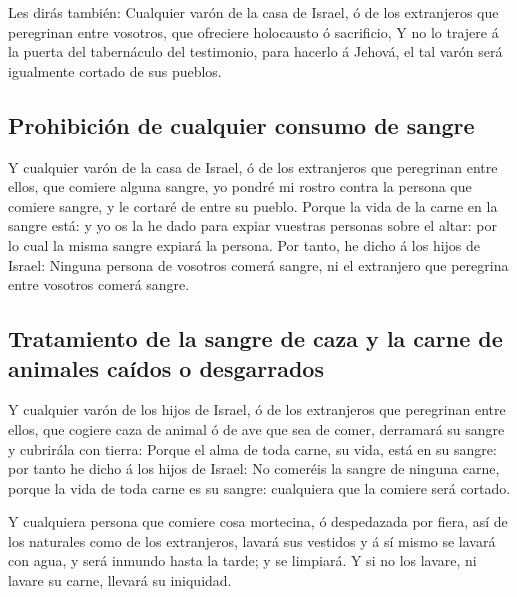  Les dirás también: Cualquier varón de la casa de Israel,
ó de los extranjeros que peregrinan entre vosotros, que ofreciere
holocausto ó sacrificio,  Y no lo trajere á la puerta del
tabernáculo del testimonio, para hacerlo á Jehová, el tal varón será
igualmente cortado de sus pueblos.

\hypertarget{prohibiciuxf3n-de-cualquier-consumo-de-sangre}{%
\subsection{Prohibición de cualquier consumo de
sangre}\label{prohibiciuxf3n-de-cualquier-consumo-de-sangre}}

 Y cualquier varón de la casa de Israel, ó de los
extranjeros que peregrinan entre ellos, que comiere alguna sangre, yo
pondré mi rostro contra la persona que comiere sangre, y le cortaré de
entre su pueblo.  Porque la vida de la carne en la sangre
está: y yo os la he dado para expiar vuestras personas sobre el altar:
por lo cual la misma sangre expiará la persona.  Por
tanto, he dicho á los hijos de Israel: Ninguna persona de vosotros
comerá sangre, ni el extranjero que peregrina entre vosotros comerá
sangre.

\hypertarget{tratamiento-de-la-sangre-de-caza-y-la-carne-de-animales-cauxeddos-o-desgarrados}{%
\subsection{Tratamiento de la sangre de caza y la carne de animales
caídos o
desgarrados}\label{tratamiento-de-la-sangre-de-caza-y-la-carne-de-animales-cauxeddos-o-desgarrados}}

 Y cualquier varón de los hijos de Israel, ó de los
extranjeros que peregrinan entre ellos, que cogiere caza de animal ó de
ave que sea de comer, derramará su sangre y cubrirála con tierra:
 Porque el alma de toda carne, su vida, está en su
sangre: por tanto he dicho á los hijos de Israel: No comeréis la sangre
de ninguna carne, porque la vida de toda carne es su sangre: cualquiera
que la comiere será cortado.

 Y cualquiera persona que comiere cosa mortecina, ó
despedazada por fiera, así de los naturales como de los extranjeros,
lavará sus vestidos y á sí mismo se lavará con agua, y será inmundo
hasta la tarde; y se limpiará.  Y si no los lavare, ni
lavare su carne, llevará su iniquidad.

